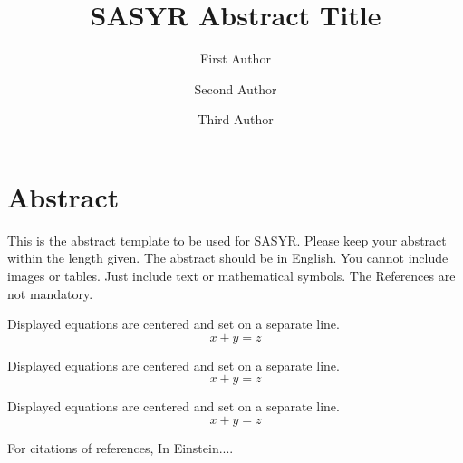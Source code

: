 \documentclass[runningheads]{llncs}
\begin{document}
%
\title{SASYR Abstract Title}
%
%
\author{First Author \and
Second Author \and
Third Author}
%
%
%
\maketitle              %
%
%
%
\section*{Abstract}
This is the abstract template to be used for SASYR. Please keep your abstract within the length given. The abstract should be in English. You cannot include images or tables. Just include text or mathematical symbols. The References are not mandatory.

\lipsum[1-1]

\noindent Displayed equations are centered and set on a separate
line.
\begin{equation}
x + y = z
\end{equation}


\noindent Displayed equations are centered and set on a separate
line.
\begin{equation}
x + y = z
\end{equation}



\noindent Displayed equations are centered and set on a separate
line.
\begin{equation}
x + y = z
\end{equation}


%

For citations of references,
In \cite{einstein} Einstein....


%
%
%


%
\end{document}
